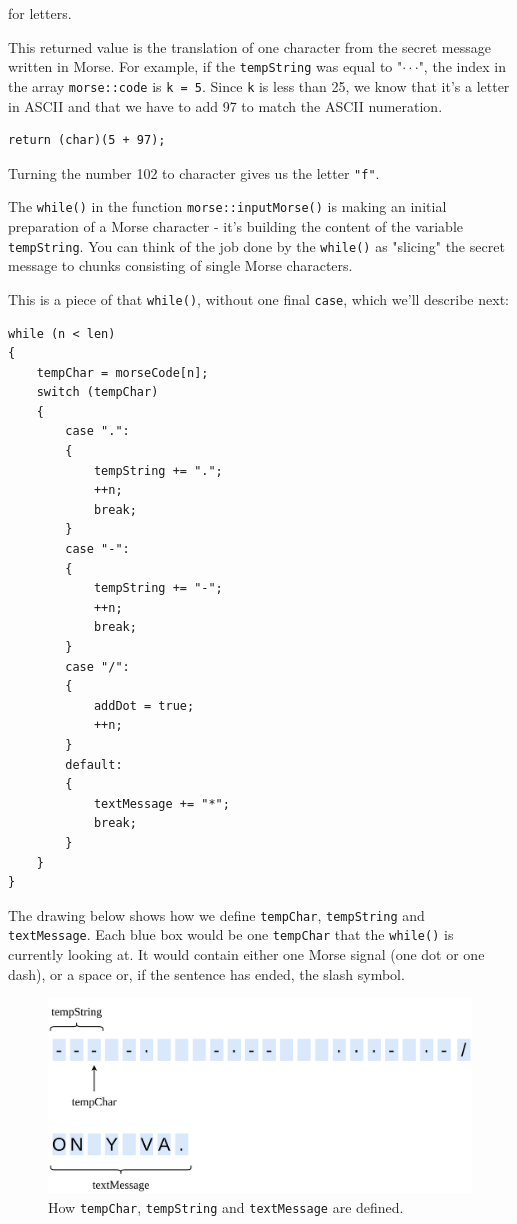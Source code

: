 \documentclass[10pt]{report}
\begin{document}
for letters.

This returned value is the translation of one character from the secret message written in Morse. For example, if the \verb|tempString| was equal to "$\cdot\cdot$\text{-}$\cdot$", the index in the array \verb|morse::code| is \verb|k = 5|. Since \verb|k| is less than 25, we know that it's a letter in ASCII and that we have to add 97 to match the ASCII numeration. 

\begin{lstlisting}
return (char)(5 + 97);
\end{lstlisting}

Turning the number 102 to character gives us the letter \verb|"f"|.

The \verb|while()| in the function  \verb|morse::inputMorse()| is making an initial preparation of a Morse character - it's building the content of the variable \verb|tempString|. You can think of the job done by the \verb|while()| as "slicing" the secret message to chunks consisting of single Morse characters.

This is a piece of that \verb|while()|, without one final \verb|case|, which we'll describe next:

\begin{lstlisting}
while (n < len)
{
	tempChar = morseCode[n];
	switch (tempChar)
	{
		case ".":
		{
			tempString += ".";
			++n;
			break;
		}
		case "-":
		{
			tempString += "-";
			++n;
			break;
		}
		case "/":
		{
			addDot = true;
			++n;
		}
		default:
		{
			textMessage += "*";
			break;
		}
	}
}
\end{lstlisting}

The drawing below shows how we define \verb|tempChar|, \verb|tempString| and \verb|textMessage|. Each blue box would be one \verb|tempChar| that the \verb|while()| is currently looking at. It would contain either one Morse signal (one dot or one dash), or a space or, if the sentence has ended, the slash symbol.

\begin{figure}[H]
\centering\includegraphics[width=14.5cm]{temp_string}
\caption{How \texttt{tempChar}, \texttt{tempString} and \texttt{textMessage} are defined.}
\label{fig:temp_char}
\end{figure}
\end{document}

